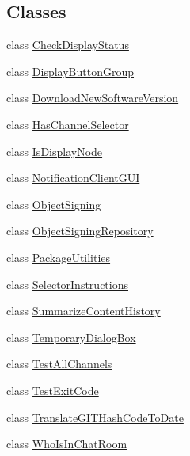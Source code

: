 \subsection*{Classes}
\begin{DoxyCompactItemize}
\item 
class \hyperlink{classgov_1_1fnal_1_1ppd_1_1dd_1_1util_1_1specific_1_1CheckDisplayStatus}{Check\-Display\-Status}
\item 
class \hyperlink{classgov_1_1fnal_1_1ppd_1_1dd_1_1util_1_1specific_1_1DisplayButtonGroup}{Display\-Button\-Group}
\item 
class \hyperlink{classgov_1_1fnal_1_1ppd_1_1dd_1_1util_1_1specific_1_1DownloadNewSoftwareVersion}{Download\-New\-Software\-Version}
\item 
class \hyperlink{classgov_1_1fnal_1_1ppd_1_1dd_1_1util_1_1specific_1_1HasChannelSelector}{Has\-Channel\-Selector}
\item 
class \hyperlink{classgov_1_1fnal_1_1ppd_1_1dd_1_1util_1_1specific_1_1IsDisplayNode}{Is\-Display\-Node}
\item 
class \hyperlink{classgov_1_1fnal_1_1ppd_1_1dd_1_1util_1_1specific_1_1NotificationClientGUI}{Notification\-Client\-G\-U\-I}
\item 
class \hyperlink{classgov_1_1fnal_1_1ppd_1_1dd_1_1util_1_1specific_1_1ObjectSigning}{Object\-Signing}
\item 
class \hyperlink{classgov_1_1fnal_1_1ppd_1_1dd_1_1util_1_1specific_1_1ObjectSigningRepository}{Object\-Signing\-Repository}
\item 
class \hyperlink{classgov_1_1fnal_1_1ppd_1_1dd_1_1util_1_1specific_1_1PackageUtilities}{Package\-Utilities}
\item 
class \hyperlink{classgov_1_1fnal_1_1ppd_1_1dd_1_1util_1_1specific_1_1SelectorInstructions}{Selector\-Instructions}
\item 
class \hyperlink{classgov_1_1fnal_1_1ppd_1_1dd_1_1util_1_1specific_1_1SummarizeContentHistory}{Summarize\-Content\-History}
\item 
class \hyperlink{classgov_1_1fnal_1_1ppd_1_1dd_1_1util_1_1specific_1_1TemporaryDialogBox}{Temporary\-Dialog\-Box}
\item 
class \hyperlink{classgov_1_1fnal_1_1ppd_1_1dd_1_1util_1_1specific_1_1TestAllChannels}{Test\-All\-Channels}
\item 
class \hyperlink{classgov_1_1fnal_1_1ppd_1_1dd_1_1util_1_1specific_1_1TestExitCode}{Test\-Exit\-Code}
\item 
class \hyperlink{classgov_1_1fnal_1_1ppd_1_1dd_1_1util_1_1specific_1_1TranslateGITHashCodeToDate}{Translate\-G\-I\-T\-Hash\-Code\-To\-Date}
\item 
class \hyperlink{classgov_1_1fnal_1_1ppd_1_1dd_1_1util_1_1specific_1_1WhoIsInChatRoom}{Who\-Is\-In\-Chat\-Room}
\end{DoxyCompactItemize}
